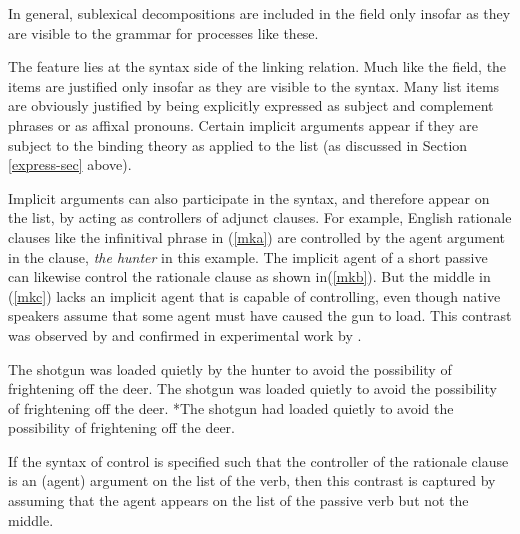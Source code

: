 \documentclass[output=paper]{langsci/langscibook}
\begin{document}
\noindent
In general, sublexical decompositions are included in the \content field only insofar as they are visible to the grammar for processes like these.  

The \argst feature lies at the syntax side of the linking relation.  Much like the \content field, the \argst items are justified only insofar as they are visible to the syntax.  Many \argst list items are obviously justified by being explicitly expressed as subject and complement phrases or as affixal pronouns.  Certain implicit arguments appear if they are subject to the binding theory as applied to the \argst list (as discussed in Section \ref{express-sec} above).  

Implicit arguments can also participate in the syntax, and therefore appear on the \argst list, by acting as controllers of adjunct clauses.  For example, English  rationale clauses like the infinitival phrase in (\ref{mka}) are controlled by the agent argument in the clause, \textit{the hunter} in this 
example.  The implicit agent of a short passive can likewise control the rationale clause as shown in(\ref{mkb}).  But the middle in (\ref{mkc}) lacks an implicit agent that is capable of controlling, even though native speakers assume that some agent must have caused the gun to load.  This contrast was observed by \citet{KeyserandRoeper1984} and confirmed in experimental work by \citet{MaunerandKoenig2000}.  

\begin{exe}
\ex\label{mk}
\begin{xlist}
\ex\label{mka}
The shotgun was loaded quietly by the hunter
to avoid the possibility of frightening off the deer.
\ex\label{mkb}The shotgun was loaded quietly
to avoid the possibility of frightening off the deer.
\ex\label{mkc}*The shotgun had loaded quietly
to avoid the possibility of frightening off the deer.
\end{xlist}
\end{exe}



\noindent
If the syntax of control  is specified such that the controller of the rationale clause is an (agent) argument on the \argst list of the verb, then this contrast is captured by assuming that the agent appears on the \argst list of the passive verb but not the middle.
\end{document}
